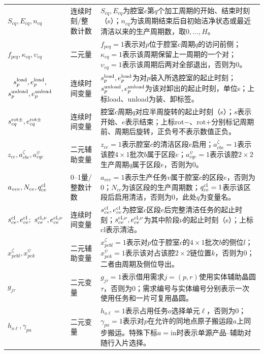 \documentclass[final,5p,times,twocolumn]{elsarticle}
\begin{document}
\begin{table}[t]
\begin{tabular}{C{0.23\textwidth}C{0.10\textwidth}C{0.61\textwidth}}
$S_{cq},E_{cq},n_{cq}$ & 连续时刻/整数计数 & $S_{cq},E_{cq}$为腔室$c$第$q$个加工周期的开始、结束时刻（s）；$n_{cq}$为该周期结束后自初始洁净状态或最近清洁以来的生产周期数，取$0,\ldots,H$。\\
$f_{pcq},\kappa_{cq},\upsilon_{cq}$ & 二元量 & $f_{pcq}=1$表示对$p$位于腔室$c$周期$q$的访问前侧；$\kappa_{cq}=1$表示该周期保留上一周期的一个对；$\upsilon_{cq}=1$表示该周期后两对全部退出，否则为0。\\
$\begin{gathered}s^{\rm load}_p,e^{\rm load}_p,\\s^{\rm unload}_p,e^{\rm unload}_p\end{gathered}$ & 连续时间变量 & $s^{\rm load}_p,e^{\rm load}_p$为对$p$装入所选腔室的起止时刻；$s^{\rm unload}_p,e^{\rm unload}_p$为该对卸出的起止时刻，单位s；上标load、unload为装、卸标签。\\
$s^{\rm rot\pm}_{cq},e^{\rm rot\pm}_{cq}$ & 连续时间变量 & 腔室$c$周期$q$对应半周旋转的起止时刻（s）；$s$表示开始、$e$表示结束；上标rot$-$、rot$+$分别标记周期前、周期后旋转，正负号不表示数值正负。\\
$z_{ce},a^{\zeta}_{cbe},a^{\psi}_{cqe}$ & 二元辅助变量 & $z_{ce}=1$表示腔室$c$的清洁区段$e$启用；$a^{\zeta}_{cbe}=1$表示该腔$4\times1$批次$b$属于区段$e$；$a^{\psi}_{cqe}=1$表示该腔$2\times2$生产周期$q$属于区段$e$，否则为0。\\
$a_{vce},N_{ce},q^{\rm cl}_{ce}$ & 0--1量/整数计数 & $a_{vce}=1$表示生产任务$v$属于腔室$c$的区段$e$，否则为0；$N_{ce}$为该区段的生产周期数；$q^{\rm cl}_{ce}=1$表示该区段后启用清洁，否则为0，此处$q$为变量名。\\
$s^{\rm cl}_{ce},e^{\rm cl}_{ce};\ s^{\rm cl,\nu}_{ce},e^{\rm cl,\nu}_{ce}$ & 连续时间变量 & $s^{\rm cl}_{ce},e^{\rm cl}_{ce}$为腔室$c$区段$e$后完整清洁任务的起止时刻；$s^{\rm cl,\nu}_{ce},e^{\rm cl,\nu}_{ce}$为其中阶段$\nu$的起止时刻（s）；上标cl表示清洁。\\
$x^{\zeta}_{pcbl},x^{\psi}_{pck}$ & 二元辅助变量 & $x^{\zeta}_{pcbl}=1$表示对$p$位于腔室$c$的$4\times1$批次$b$的侧位$l$；$x^{\psi}_{pck}=1$表示该对占该腔$2\times2$链位置$k$，否则为0；二者由周期及侧位导出。\\
$g_{j\tau}$ & 二元变量 & $g_{j\tau}=1$表示借用需求$j=(p,r)$使用实体辅助晶圆$\tau$，否则为0；需求编号与实体编号分别表示一次使用任务和一片可复用晶圆。\\
$h_{o\ell},\gamma_{pa}$ & 二元变量 & $h_{o\ell}=1$表示占用任务$o$选择单元$\ell$，否则为0；$\gamma_{pa}=1$表示对$p$在允许的同地点原子搬运段$a$上同步搬运。特殊下标$a=\mathrm{in}$时表示单源产品--辅助对随行入片选择。\\

\end{tabular}
\end{table}
\end{document}
